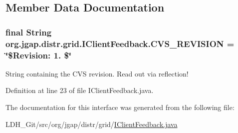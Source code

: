 \subsection{Member Data Documentation}
\hypertarget{interfaceorg_1_1jgap_1_1distr_1_1grid_1_1_i_client_feedback_a6d925edd2c503da763c6738806420206}{
\subsubsection[{C\-V\-S\-\_\-\-R\-E\-V\-I\-S\-I\-O\-N}]{\setlength{\rightskip}{0pt plus 5cm}final String org.\-jgap.\-distr.\-grid.\-I\-Client\-Feedback.\-C\-V\-S\-\_\-\-R\-E\-V\-I\-S\-I\-O\-N = \char`\"{}\$Revision\-: 1. \$\char`\"{}\hspace{0.3cm}{\ttfamily [static]}}}\label{interfaceorg_1_1jgap_1_1distr_1_1grid_1_1_i_client_feedback_a6d925edd2c503da763c6738806420206}
String containing the C\-V\-S revision. Read out via reflection! 

Definition at line 23 of file I\-Client\-Feedback.\-java.



The documentation for this interface was generated from the following file\-:\begin{DoxyCompactItemize}
\item 
L\-D\-H\-\_\-\-Git/src/org/jgap/distr/grid/\hyperlink{_i_client_feedback_8java}{I\-Client\-Feedback.\-java}\end{DoxyCompactItemize}
